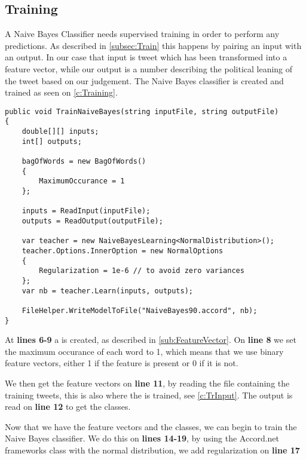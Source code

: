\subsection{Training}
A Naive Bayes Classifier needs supervised training in order to perform any
predictions. As described in \autoref{subsec:Train} this happens by pairing an
input with an output. In our case that input is tweet which has been transformed
into a feature vector, while our output is a number describing the political
leaning of the tweet based on our judgement. The Naive Bayes classifier is
created and trained as seen on \autoref{c:Training}.\nl

\begin{minipage}[H]{\linewidth}
\begin{lstlisting}[caption = Creating and training the classifier, label =
c:Training] 
public void TrainNaiveBayes(string inputFile, string outputFile)
{
    double[][] inputs;
    int[] outputs;

    bagOfWords = new BagOfWords()
    {
        MaximumOccurance = 1
    };

    inputs = ReadInput(inputFile);
    outputs = ReadOutput(outputFile);

    var teacher = new NaiveBayesLearning<NormalDistribution>();
    teacher.Options.InnerOption = new NormalOptions
    {
        Regularization = 1e-6 // to avoid zero variances
    };
    var nb = teacher.Learn(inputs, outputs);

    FileHelper.WriteModelToFile("NaiveBayes90.accord", nb);
}
\end{lstlisting}
\end{minipage}

At \textbf{lines 6-9} a  is created, as described in
\autoref{sub:FeatureVector}. On \textbf{line 8} we set the maximum occurance of
each word to 1, which means that we use binary feature vectors, either 1 if
the feature is present or 0 if it is not.

We then get the feature vectors on \textbf{line 11}, by reading the file
containing the training tweets, this is also where the  is
trained, see \autoref{c:TrInput}. The output is read on \textbf{line 12} to get
the classes.

Now that we have the feature vectors and the classes, we can begin to train the
Naive Bayes classifier. We do this on \textbf{lines 14-19}, by using the
Accord.net frameworks  class with the normal
distribution, we add regularization on \textbf{line 17} 

